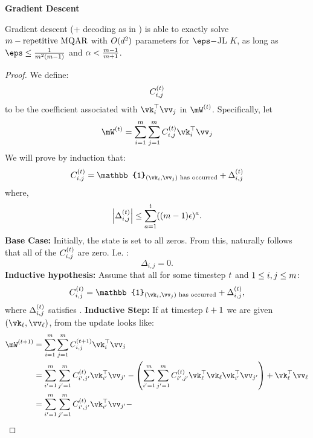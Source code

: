 \textbf{Gradient Descent}
\begin{theorem}
       Gradient descent (+ decoding as in ) is able to exactly solve $m-\text{repetitive MQAR}$ with $O(d^2)$ parameters for $\eps-$JL $K$, as long as $\eps \le \frac{1}{\numPairs^{2}(\numPairs-1)}$ and $\alpha<\frac{m-1}{m+1}$.
\end{theorem}
\begin{proof}
    We define:
    \[ C_{i,j}^{(t)} \]
    to be the coefficient associated with $\vk_i^{\top} \vv_{j}$ in $\mW^{(\timestep)}$. Specifically, let
\begin{equation}\label{Def: CacheMatrix}
        \cacheMatrixTime{\timestep} = \sum_{i=1}^{\numPairs} \sum_{j=1}^{\numPairs} \errs{i}{j}{\timestep} \vk_{i}^{\top} \vv_{j}
\end{equation}
    We will prove by induction that:
    \begin{equation}\label{eq:errs}\errs{i}{j}{t}=\mathbb{1}_{(\vk_{i},\vv_{j}) \text{ has occurred}} + \Delta^{(\timestep)}_{i,j}
    \end{equation}
    where,
    \begin{equation}\label{eq:delta}\left|\Delta_{i,j}^{(t)}\right| \le \sum_{a=1}^{t}((m-1)\epsilon)^{a}.
    \end{equation}
    \textbf{Base Case:} Initially, the state is set to all zeros. From this, naturally follows that  all of the $C_{i,j}^{(t)}$ are zero. I.e. :
    \[\Delta_{i,j}=0.\]
    \textbf{Inductive hypothesis:} Assume that all for some timestep $t$ and $1\le i, j \le m$:
    \[\errs{i}{j}{t}=\mathbb{1}_{(\vk_{i},\vv_{j}) \text{ has occurred}} + \Delta^{(\timestep)}_{i,j},\]
    where $\Delta_{i,j}^{(t)}$ satisfies .
    \textbf{Inductive Step:}
    If at timestep $t+1$ we are given $(\vk_{\ell}, \vv_{\ell})$, from  the update looks like:
    \begin{align*}
    \mW^{(\timestep+1)}&=\sum_{i=1}^{\numPairs} \sum_{j=1}^{\numPairs} \errs{i}{j}{\timestep+1} \vk_{i}^{\top} \vv_{j}\\ &= \sum_{i'=1}^{\numPairs} \sum_{j'=1}^{\numPairs} \errs{i'}{j'}{\timestep} \vk_{i'}^{\top} \vv_{j'} -
    \left(\sum_{i'=1}^{\numPairs} \sum_{j'=1}^{\numPairs} \errs{i'}{j'}{\timestep}\vk_{\ell}^{\top}\vk_{\ell} \vk_{i'}^{\top} \vv_{j'} \right) + \vk_{\ell}^{\top}\vv_{\ell} \\
    &= \sum_{i'=1}^{\numPairs} \sum_{j'=1}^{\numPairs} \errs{i'}{j'}{\timestep} \vk_{i'}^{\top} \vv_{j'} -

\end{align*}
\end{proof}
